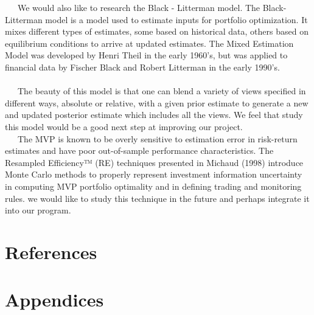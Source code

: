 \documentclass[12pt,titlepage,a4paper]{article}
\begin{document}
	\ \ \ We would also like to research the Black - Litterman model. The Black-Litterman model is a model used to estimate inputs for portfolio optimization. It mixes different types of estimates, some based on historical data, others based on equilibrium conditions to arrive at updated estimates. The Mixed Estimation Model was developed by Henri Theil in the early 1960's, but was applied to financial data by Fischer Black and Robert Litterman in the early 1990's.\\ \\

	\ \ \ The beauty of this model is that one can blend a variety of views specified in different ways, absolute or relative, with a given prior estimate to generate a new and updated posterior estimate which includes all the views.  We feel that study this model would be a good next step at improving our project.\\

	\ \ \ The MVP is known to be overly sensitive to estimation error in risk-return estimates and have poor out-of-sample performance characteristics. The Resampled Efficiency™ (RE) techniques presented in Michaud (1998) introduce Monte Carlo methods to properly represent investment information uncertainty in computing MVP portfolio optimality and in defining trading and monitoring rules.  we would like to study this technique in the future and perhaps integrate it into our program.\\

\section{References}

\section{Appendices}
\end{document}
